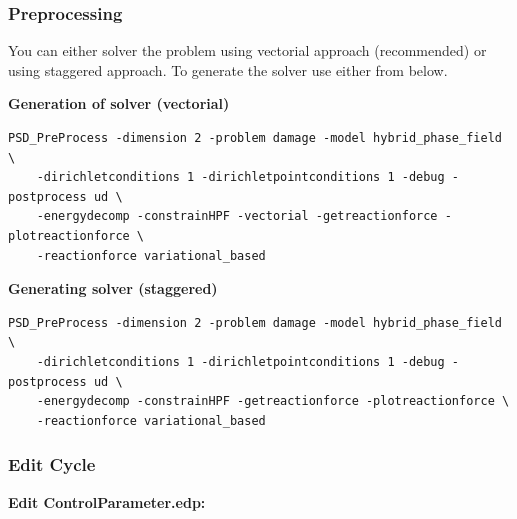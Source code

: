 \subsubsection{Preprocessing}

You can either solver the problem using vectorial approach (recommended) or using staggered approach. To generate the solver use either from below.

\textbf{Generation of solver (vectorial)}

\begin{lstlisting}[style=BashInputStyle]
	PSD_PreProcess -dimension 2 -problem damage -model hybrid_phase_field \
	-dirichletconditions 1 -dirichletpointconditions 1 -debug -postprocess ud \
	-energydecomp -constrainHPF -vectorial -getreactionforce -plotreactionforce \
	-reactionforce variational_based
\end{lstlisting}

\textbf{Generating solver (staggered)}

\begin{lstlisting}[style=BashInputStyle]
	PSD_PreProcess -dimension 2 -problem damage -model hybrid_phase_field \
	-dirichletconditions 1 -dirichletpointconditions 1 -debug -postprocess ud \
	-energydecomp -constrainHPF -getreactionforce -plotreactionforce \
	-reactionforce variational_based
\end{lstlisting}


\subsubsection{Edit Cycle}

\textbf{Edit ControlParameter.edp:}

